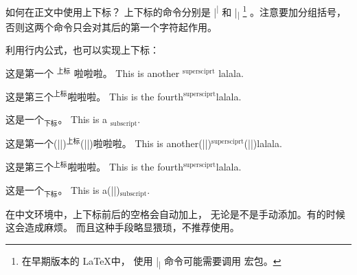 \begin{myQA}{如何在正文中使用上下标？}
	上下标的命令分别是 \code|\textsuperscript|
	和 \code|\textsubscript|
	\footnote{在早期版本的 \LaTeX 中，
		使用 \code|\textsubscript| 命令可能需要调用
		  宏包。}
	。注意要加分组括号，
	否则这两个命令只会对其后的第一个字符起作用。
	
	利用行内公式，也可以实现上下标：
\begin{myExampleV}
{
	\vspace{1 ex}
	
	这是第一个 $^\text{上标}$ 啦啦啦。
	This is another $^\text{supersciprt}$ lalala.
	
	这是第三个$^\text{上标}$啦啦啦。
	This is the fourth$^\text{supersciprt}$lalala.
	
	这是一个$_\text{下标}$。
	This is a $_\text{subscript}$.
}
这是第一个(|\textvisiblespace|)$^\text{上标}$(|\textvisiblespace|)啦啦啦。
This is another(|\textvisiblespace|)$^\text{supersciprt}$(|\textvisiblespace|)lalala.

这是第三个$^\text{上标}$啦啦啦。
This is the fourth$^\text{supersciprt}$lalala.

这是一个$_\text{下标}$。
This is a(|\textvisiblespace|)$_\text{subscript}$.
\end{myExampleV}
	在中文环境中，上下标前后的空格会自动加上，
	无论是不是手动添加。有的时候这会造成麻烦。
	而且这种手段略显猥琐，不推荐使用。
	
\end{myQA}